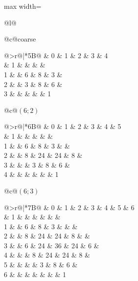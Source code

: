 \documentclass[11pt,reqno]{amsart}
\makeatletter
\theoremstyle{remark}
\newcommand{\z}{\textendash}               %
\newcommand{\h}[1]{{\scriptsize #1}}       %
\newenvironment{betti}[1]
  {\begingroup\setlength{\tabcolsep}{1.5pt}%
      \renewcommand{\arraystretch}{.95}%
   \begin{tabular}[t]{@{}>{\scriptsize}r@{\hspace{5pt}}|*{#1}{B}@{}}}
  {\end{tabular}\endgroup}
\newcommand{\bettipanel}[2]{%
  \begin{tabular}[t]{@{}c@{}}\small #1\\[3pt] #2\end{tabular}}
\makeatother
\begin{document}
\begin{figure}
\begin{adjustbox}{max width=\linewidth}
\begin{tabular}{@{}l@{}}
\bettipanel{coarse}{%
\begin{betti}{5}
  & \h0 & \h1 & \h2 & \h3 & \h4 \\ \hline
0 & 1  & \z & \z & \z & \z \\
1 & \z & 6  & 8  & 3  & \z \\
2 & \z & 3  & 8  & 6  & \z \\
3 & \z & \z & \z & \z & 1
\end{betti}}%
\hspace{2.2em}%
\bettipanel{$(6;2)$}{%
\begin{betti}{6}
  & \h0 & \h1 & \h2 & \h3 & \h4 & \h5 \\ \hline
0 & 1  & \z & \z & \z & \z & \z \\
1 & \z & 6  & 8  & 3  & \z & \z \\
2 & \z & 8  & 24 & 24 & 8  & \z \\
3 & \z & \z & 3  & 8  & 6  & \z \\
4 & \z & \z & \z & \z & \z & 1
\end{betti}}%
\hspace{2.2em}%
\bettipanel{$(6;3)$}{%
\begin{betti}{7}
  & \h0 & \h1 & \h2 & \h3 & \h4 & \h5 & \h6 \\ \hline
0 & 1  & \z & \z & \z & \z & \z & \z \\
1 & \z & 6  & 8  & 3  & \z & \z & \z \\
2 & \z & 8  & 24 & 24 & 8  & \z & \z \\
3 & \z & 6  & 24 & 36 & 24 & 6  & \z \\
4 & \z & \z & 8  & 24 & 24 & 8  & \z \\
5 & \z & \z & \z & 3  & 8  & 6  & \z \\
6 & \z & \z & \z & \z & \z & \z & 1
\end{betti}}
%

\end{tabular}
\end{adjustbox}
\end{figure}
\end{document}
